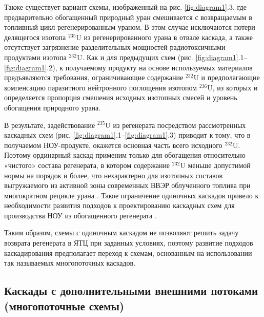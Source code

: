 Также существует вариант схемы, изображенный на рис. \ref{fig:diagram1}.3, где предварительно обогащенный природный уран смешивается с возвращаемым в топливный цикл регенерированным ураном. В этом случае исключаются потери делящегося изотопа $^{235}$U из регенерированного урана в отвале каскада, а также отсутствует загрязнение разделительных мощностей радиотоксичными продуктами изотопа $^{232}$U. Как и для предыдущих схем (рис. \ref{fig:diagram1}.1--\ref{fig:diagram1}.2), к получаемому продукту на основе используемых материалов предъявляются требования, ограничивающие содержание $^{232}$U и предполагающие компенсацию паразитного нейтронного поглощения изотопом $^{236}$U, из которых и определяется пропорция смешения исходных изотопных смесей и уровень обогащения природного урана.


В результате, задействование $^{235}$U из регенерата посредством рассмотренных каскадных схем (рис. \ref{fig:diagram1}.1--\ref{fig:diagram1}.3) приводит к тому, что в получаемом НОУ-продукте, окажется основная часть всего исходного $^{232}$U. Поэтому ординарный каскад применим только для обогащения относительно «чистого» состава регенерата, в котором содержание $^{232}$U меньше допустимой нормы на порядок и более, что нехарактерно для изотопных составов выгружаемого из активной зоны современных ВВЭР облученного топлива при многократном рецикле урана \cite{bormanTehnikoekonomicheskiyAnalizVozmozhnyh2012}. Такое ограничение одиночных каскадов привело к необходимости развития подходов к проектированию каскадных схем для производства НОУ из обогащенного регенерата \cite{sulaberidzeNekotoryhRazdelitelnyhProblemah2004,sulaberidzeProblemsRefinementRecycled4, smirnovKaskadnyeShemyZadachah2012}.

Таким образом, схемы с одиночным каскадом не позволяют решить задачу возврата регенерата в ЯТЦ при заданных условиях, поэтому развитие подходов каскадирования предполагает переход к схемам, основанным на использовании так называемых многопоточных каскадов.

\subsection{Каскады с дополнительными внешними потоками (многопоточные схемы)}

